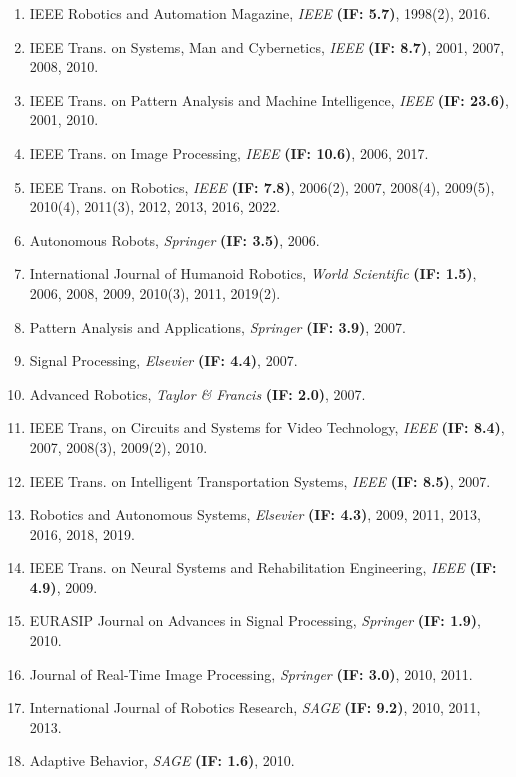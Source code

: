 \begin{enumerate}
\def\labelenumi{\arabic{enumi}.}
\setcounter{enumi}{2}
\item
  IEEE Robotics and Automation Magazine, \emph{IEEE} \textbf{(IF: 5.7)},
  1998(2), 2016.
\item
  IEEE Trans. on Systems, Man and Cybernetics, \emph{IEEE} \textbf{(IF:
  8.7)}, 2001, 2007, 2008, 2010.
\item
  IEEE Trans. on Pattern Analysis and Machine Intelligence, \emph{IEEE}
  \textbf{(IF: 23.6)}, 2001, 2010.
\item
  IEEE Trans. on Image Processing, \emph{IEEE} \textbf{(IF: 10.6)},
  2006, 2017.
\item
  IEEE Trans. on Robotics, \emph{IEEE} \textbf{(IF: 7.8)}, 2006(2),
  2007, 2008(4), 2009(5), 2010(4), 2011(3), 2012, 2013, 2016, 2022.
\item
  Autonomous Robots, \emph{Springer} \textbf{(IF: 3.5)}, 2006.
\item
  International Journal of Humanoid Robotics, \emph{World Scientific}
  \textbf{(IF: 1.5)}, 2006, 2008, 2009, 2010(3), 2011, 2019(2).
\item
  Pattern Analysis and Applications, \emph{Springer} \textbf{(IF: 3.9)},
  2007.
\item
  Signal Processing, \emph{Elsevier} \textbf{(IF: 4.4)}, 2007.
\item
  Advanced Robotics, \emph{Taylor \& Francis} \textbf{(IF: 2.0)}, 2007.
\item
  IEEE Trans, on Circuits and Systems for Video Technology, \emph{IEEE}
  \textbf{(IF: 8.4)}, 2007, 2008(3), 2009(2), 2010.
\item
  IEEE Trans. on Intelligent Transportation Systems, \emph{IEEE}
  \textbf{(IF: 8.5)}, 2007.
\item
  Robotics and Autonomous Systems, \emph{Elsevier} \textbf{(IF: 4.3)},
  2009, 2011, 2013, 2016, 2018, 2019.
\item
  IEEE Trans. on Neural Systems and Rehabilitation Engineering,
  \emph{IEEE} \textbf{(IF: 4.9)}, 2009.
\item
  EURASIP Journal on Advances in Signal Processing, \emph{Springer}
  \textbf{(IF: 1.9)}, 2010.
\item
  Journal of Real-Time Image Processing, \emph{Springer} \textbf{(IF:
  3.0)}, 2010, 2011.
\item
  International Journal of Robotics Research, \emph{SAGE} \textbf{(IF:
  9.2)}, 2010, 2011, 2013.
\item
  Adaptive Behavior, \emph{SAGE} \textbf{(IF: 1.6)}, 2010.

\end{enumerate}

